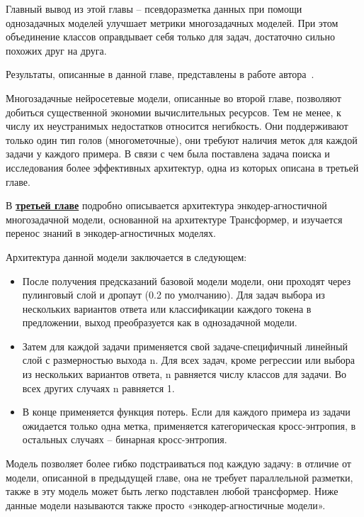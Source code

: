 Главный вывод из этой главы -- псевдоразметка данных при помощи однозадачных моделей улучшает метрики многозадачных моделей. При этом объединение классов оправдывает себя только для задач, достаточно сильно похожих друг на друга. 

Результаты, описанные в данной главе, представлены в работе автора~\cite{pseudolabel}.


Многозадачные нейросетевые модели, описанные во второй главе, позволяют добиться существенной экономии вычислительных ресурсов. Тем не менее, к числу их неустранимых недостатков относится негибкость.
Они поддерживают только один тип голов (многометочные), они требуют наличия меток для каждой задачи у каждого примера. В связи с чем была поставлена задача поиска и исследования более эффективных архитектур, одна из которых описана в {третьей главе}.

В \underline{\textbf{третьей главе}}  подробно описывается архитектура энкодер-агностичной многозадачной модели, основанной на архитектуре Трансформер, и изучается перенос знаний в энкодер-агностичных моделях.

Архитектура данной модели заключается в следующем:
\begin{itemize}

  \item После получения предсказаний базовой модели модели, они проходят через пулинговый слой и дропаут (0.2 по умолчанию). Для задач выбора из нескольких вариантов ответа или классификации каждого токена в предложении, выход преобразуется как в однозадачной модели.

  \item Затем для каждой задачи применяется свой задаче-специфичный линейный слой с размерностью выхода {n}. Для всех задач, кроме регрессии или выбора из нескольких вариантов ответа, {n} равняется числу классов для задачи. Во всех других случаях {n} равняется 1.
 
  \item В конце применяется функция потерь. Если для каждого примера из задачи ожидается только одна метка, применяется категорическая кросс-энтропия, в остальных случаях -- бинарная кросс-энтропия. 

\end{itemize}

Модель позволяет более гибко подстраиваться под каждую задачу: в отличие от модели, описанной в предыдущей главе, она не требует параллельной разметки, также в эту модель может быть легко подставлен любой трансформер. Ниже данные модели называются также просто «энкодер-агностичные модели».


